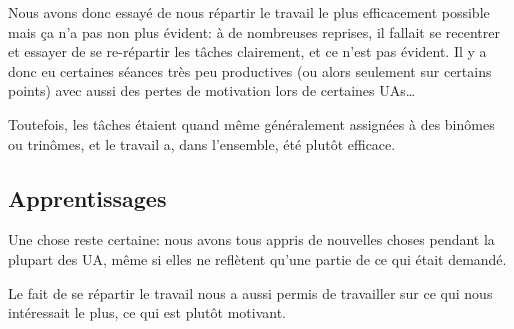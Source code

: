 Nous avons donc essayé de nous répartir le travail le plus efficacement possible
mais ça n'a pas non plus évident: à de nombreuses reprises, il fallait se recentrer
et essayer de se re-répartir les tâches clairement, et ce n'est pas évident.
Il y a donc eu certaines séances très peu productives (ou alors seulement
sur certains points) avec aussi des pertes de motivation lors de certaines UAs\dots

Toutefois, les tâches étaient quand même généralement assignées à des binômes
ou trinômes, et le travail a, dans l'ensemble, été plutôt efficace.

\subsection{Apprentissages}


Une chose reste certaine: nous avons tous appris de nouvelles choses pendant
la plupart des UA, même si elles ne reflètent qu'une partie de ce qui était demandé.

Le fait de se répartir le travail nous a aussi permis de travailler sur ce qui nous
intéressait le plus, ce qui est plutôt motivant.
